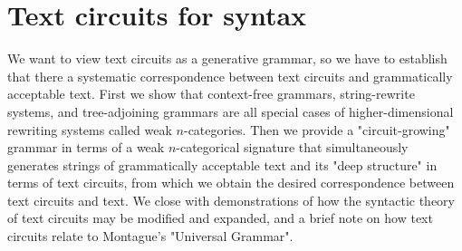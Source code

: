



\maketitle%

\tableofcontents{}

\chapter{Text circuits for syntax}\label{chapter:textcircuits}
We want to view text circuits as a generative grammar, so we have to establish that there a systematic correspondence between text circuits and grammatically acceptable text. First we show that context-free grammars, string-rewrite systems, and tree-adjoining grammars are all special cases of higher-dimensional rewriting systems called weak $n$-categories. Then we provide a "circuit-growing" grammar in terms of a weak $n$-categorical signature that simultaneously generates strings of grammatically acceptable text and its "deep structure" in terms of text circuits, from which we obtain the desired correspondence between text circuits and text. We close with demonstrations of how the syntactic theory of text circuits may be modified and expanded, and a brief note on how text circuits relate to Montague's "Universal Grammar".
\newpage

%
%





